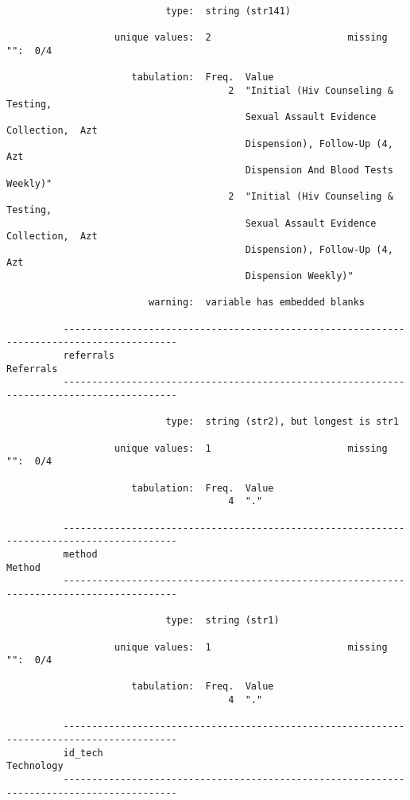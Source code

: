 \documentclass{article}
\begin{document}
\begin{verbatim}
                            type:  string (str141)
          
                   unique values:  2                        missing "":  0/4
          
                      tabulation:  Freq.  Value
                                       2  "Initial (Hiv Counseling & Testing,
                                          Sexual Assault Evidence Collection,  Azt
                                          Dispension), Follow-Up (4, Azt
                                          Dispension And Blood Tests Weekly)"
                                       2  "Initial (Hiv Counseling & Testing,
                                          Sexual Assault Evidence Collection,  Azt
                                          Dispension), Follow-Up (4, Azt
                                          Dispension Weekly)"
          
                         warning:  variable has embedded blanks
          
          ------------------------------------------------------------------------------------------
          referrals                                                                        Referrals
          ------------------------------------------------------------------------------------------
          
                            type:  string (str2), but longest is str1
          
                   unique values:  1                        missing "":  0/4
          
                      tabulation:  Freq.  Value
                                       4  "."
          
          ------------------------------------------------------------------------------------------
          method                                                                              Method
          ------------------------------------------------------------------------------------------
          
                            type:  string (str1)
          
                   unique values:  1                        missing "":  0/4
          
                      tabulation:  Freq.  Value
                                       4  "."
          
          ------------------------------------------------------------------------------------------
          id_tech                                                                         Technology
          ------------------------------------------------------------------------------------------
          

\end{verbatim}
\end{document}

